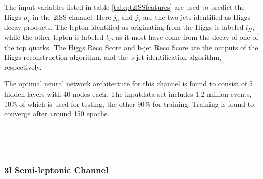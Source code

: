 The input variables listed in table \ref{tab:pt2lSSfeatures} are used to predict the Higgs $p_T$ in the 2lSS channel. Here $j_0$ and $j_1$ are the two jets identified as Higgs decay products. The lepton identified as originating from the Higgs is labeled $l_H$, while the other lepton is labeled $l_T$, as it most have come from the decay of one of the top quarks. The Higgs Reco Score and b-jet Reco Score are the outputs of the Higgs reconstruction algorithm, and the b-jet identification algorithm, respectively.



The optimal neural network architecture for this channel is found to consist of 5 hidden layers with 40 nodes each. The inputdata set includes 1.2 million events, 10\% of which is used for testing, the other 90\% for training. Training is found to converge after around 150 epochs. 

\begin{figure}[h!]
    \\
    \caption{}
    \label{fig:pt2lSSresults}
\end{figure}

\begin{figure}[h!]                                                                                                    
    \\
    \caption{}
    \label{fig:pt2lSSroc}
\end{figure}
                                                                                                                            

\subsubsection{3l Semi-leptonic Channel}
\label{subsec:pt3lS}


